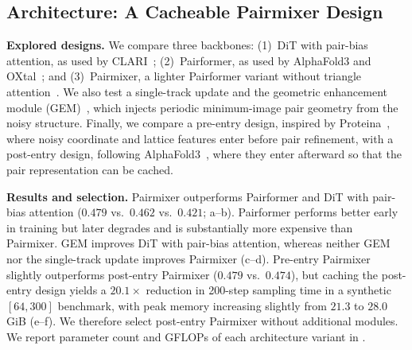 \subsection{Architecture: A Cacheable Pairmixer Design}
\label{sec:recipe-architecture}

\textbf{Explored designs.} We compare three backbones: (1)~DiT with pair-bias attention, as used by CLARI~\citep{lo2026clari}; (2)~Pairformer, as used by AlphaFold3 and OXtal~\citep{Abramson2024,jin2025oxtal}; and (3)~Pairmixer, a lighter Pairformer variant without triangle attention~\citep{ouyangzhang2025triangle}. We also test a single-track update and the geometric enhancement module (GEM)~\citep{veljkovic2026crystalite}, which injects periodic minimum-image pair geometry from the noisy structure. Finally, we compare a pre-entry design, inspired by Proteina~\citep{geffner2025proteina}, where noisy coordinate and lattice features enter before pair refinement, with a post-entry design, following AlphaFold3~\citep{Abramson2024}, where they enter afterward so that the pair representation can be cached.



\textbf{Results and selection.}
Pairmixer outperforms Pairformer and DiT with pair-bias attention
($0.479$ vs.\ $0.462$ vs.\ $0.421$; a--b).
Pairformer performs better early in training but later degrades and is
substantially more expensive than Pairmixer. GEM improves DiT with pair-bias
attention, whereas neither GEM nor the single-track update improves Pairmixer
(c--d). Pre-entry Pairmixer slightly
outperforms post-entry Pairmixer ($0.479$ vs.\ $0.474$), but caching the post-entry design yields a $20.1\times$ reduction in 200-step sampling time in a synthetic $[64,300]$ benchmark, with peak memory increasing slightly from $21.3$ to $28.0$ GiB (e--f). We therefore
select post-entry Pairmixer without additional modules. We report parameter count and GFLOPs of each architecture variant in .



